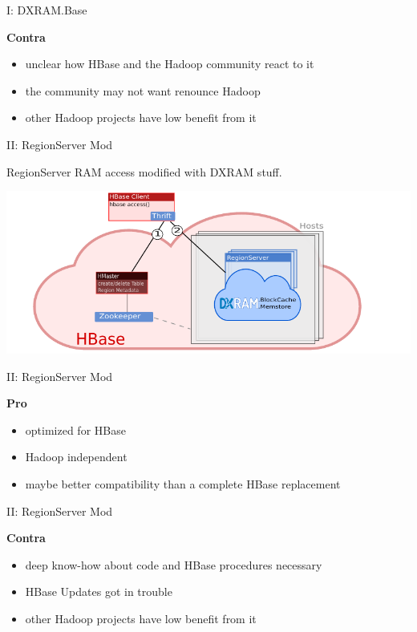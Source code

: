 \begin{frame}{I: DXRAM.Base}
\protect\hypertarget{i-dxram.base-2}{}

\textbf{Contra}

\begin{itemize}
\tightlist
\item
  unclear how HBase and the Hadoop community react to it
\item
  the community may not want renounce Hadoop
\item
  other Hadoop projects have low benefit from it
\end{itemize}

\end{frame}

\begin{frame}{II: RegionServer Mod}
\protect\hypertarget{ii-regionserver-mod}{}

RegionServer RAM access modified with DXRAM stuff.

\includegraphics{fig/regionserverMod.pdf}

\end{frame}

\begin{frame}{II: RegionServer Mod}
\protect\hypertarget{ii-regionserver-mod-1}{}

\textbf{Pro}

\begin{itemize}
\tightlist
\item
  optimized for HBase
\item
  Hadoop independent
\item
  maybe better compatibility than a complete HBase replacement
\end{itemize}

\end{frame}

\begin{frame}{II: RegionServer Mod}
\protect\hypertarget{ii-regionserver-mod-2}{}

\textbf{Contra}

\begin{itemize}
\tightlist
\item
  deep know-how about code and HBase procedures necessary
\item
  HBase Updates got in trouble
\item
  other Hadoop projects have low benefit from it
\end{itemize}

\end{frame}

